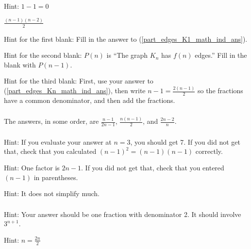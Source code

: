 \subsubsection*{ \answers}
\begin{apart}
    \item \label{part_edges_K1_math_ind_ans} Hint: $1-1=0$
    \item \label{part_edges_Kn_math_ind_ans} $\frac{(n-1)(n-2)}{2}$
    \item Hint for the first blank: Fill in the answer to (\ref{part_edges_K1_math_ind_ans}).  
    
    Hint for the second blank: $P(n)$ is ``The graph $K_n$ has $f(n)$ edges.''  Fill in the blank with $P(n-1)$.  
    
    Hint for the third blank:  First, use your answer to (\ref{part_edges_Kn_math_ind_ans}), then write $n-1 = \frac{2(n-1)}{2}$ so the fractions have a common denominator, and then add the fractions.
\end{apart}

\subsubsection*{ \answers}
The answers, in some order, are
$\frac{n-1}{2n-1}$, $\frac{n(n-1)}{2}$, and $\frac{2n-2}{n}$.

\subsubsection*{ \answers}
\begin{apart}
    \item Hint: If you evaluate your answer at $n=3$, you should get 7. If you did not get that, check that you calculated $(n-1)^2=(n-1)(n-1)$ correctly.
    \item Hint: One factor is $2n-1$.  If you did not get that, check that you entered $(n-1)$ in parentheses.
    \item Hint: It does not simplify much.
\end{apart}

\subsubsection*{ \answers}
\begin{apart}
    \item Hint: Your answer should be one fraction with denominator 2.  It should involve $3^{n+1}$.  
    \item Hint: $n = \frac{2n}{2}$
\end{apart}

